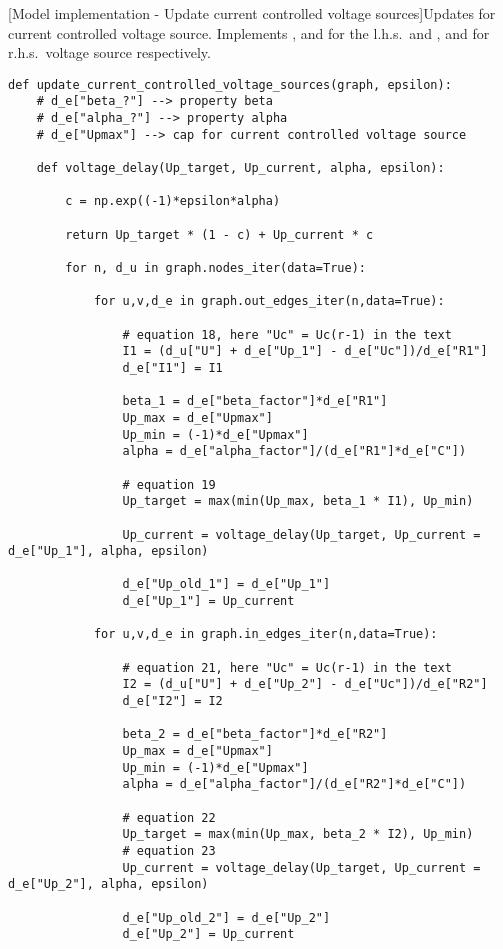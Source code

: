 \begin{codesnippet}
[Model implementation - Update current controlled voltage sources]{Updates for current controlled voltage source. Implements ,  and  for the l.h.s.\ and ,  and  for r.h.s.\ voltage source respectively.}
\label{code:current_controlled_voltage_sources}
\begin{verbatim}
def update_current_controlled_voltage_sources(graph, epsilon):
	# d_e["beta_?"] --> property beta
	# d_e["alpha_?"] --> property alpha
	# d_e["Upmax"] --> cap for current controlled voltage source
	
	def voltage_delay(Up_target, Up_current, alpha, epsilon):
		
		c = np.exp((-1)*epsilon*alpha)
		
		return Up_target * (1 - c) + Up_current * c

		for n, d_u in graph.nodes_iter(data=True):

			for u,v,d_e in graph.out_edges_iter(n,data=True):

				# equation 18, here "Uc" = Uc(r-1) in the text
				I1 = (d_u["U"] + d_e["Up_1"] - d_e["Uc"])/d_e["R1"]
				d_e["I1"] = I1

				beta_1 = d_e["beta_factor"]*d_e["R1"]
				Up_max = d_e["Upmax"]
				Up_min = (-1)*d_e["Upmax"]
				alpha = d_e["alpha_factor"]/(d_e["R1"]*d_e["C"])

				# equation 19
				Up_target = max(min(Up_max, beta_1 * I1), Up_min)
	
				Up_current = voltage_delay(Up_target, Up_current = d_e["Up_1"], alpha, epsilon)

				d_e["Up_old_1"] = d_e["Up_1"]
				d_e["Up_1"] = Up_current

			for u,v,d_e in graph.in_edges_iter(n,data=True):

				# equation 21, here "Uc" = Uc(r-1) in the text
				I2 = (d_u["U"] + d_e["Up_2"] - d_e["Uc"])/d_e["R2"]
				d_e["I2"] = I2

				beta_2 = d_e["beta_factor"]*d_e["R2"]
				Up_max = d_e["Upmax"]
				Up_min = (-1)*d_e["Upmax"]
				alpha = d_e["alpha_factor"]/(d_e["R2"]*d_e["C"])

				# equation 22
				Up_target = max(min(Up_max, beta_2 * I2), Up_min)
				# equation 23
				Up_current = voltage_delay(Up_target, Up_current = d_e["Up_2"], alpha, epsilon)

				d_e["Up_old_2"] = d_e["Up_2"]
				d_e["Up_2"] = Up_current
\end{verbatim}


\end{codesnippet}


